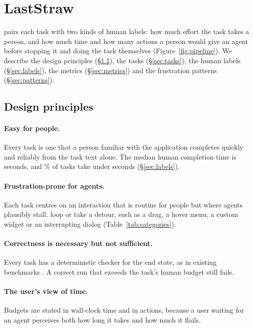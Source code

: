 \section{LastStraw}
\label{sec:benchmark}



\bench pairs each task with two kinds of human labels: how much effort the task takes a person, and how much time and how many actions a person would give an agent before stopping it and doing the task themselves (Figure~\ref{fig:pipeline}). We describe the design principles (\S\ref{sec:principles}), the tasks (\S\ref{sec:tasks}), the human labels (\S\ref{sec:labels}), the metrics (\S\ref{sec:metrics}) and the frustration patterns (\S\ref{sec:patterns}).

\subsection{Design principles}
\label{sec:principles}

\paragraph{Easy for people.} Every task is one that a person familiar with the application completes quickly and reliably from the task text alone. The median human completion time is  seconds, and \% of tasks take under  seconds (\S\ref{sec:labels}).

\paragraph{Frustration-prone for agents.} Each task centres on an interaction that is routine for people but where agents plausibly stall, loop or take a detour, such as a drag, a hover menu, a custom widget or an interrupting dialog (Table~\ref{tab:categories}).

\paragraph{Correctness is necessary but not sufficient.} Every task has a deterministic checker for the end state, as in existing benchmarks \citep{xie2024osworld,zhou2024webarena}. A correct run that exceeds the task's human budget still fails.

\paragraph{The user's view of time.} Budgets are stated in wall-clock time and in actions, because a user waiting for an agent perceives both how long it takes and how much it flails. 


